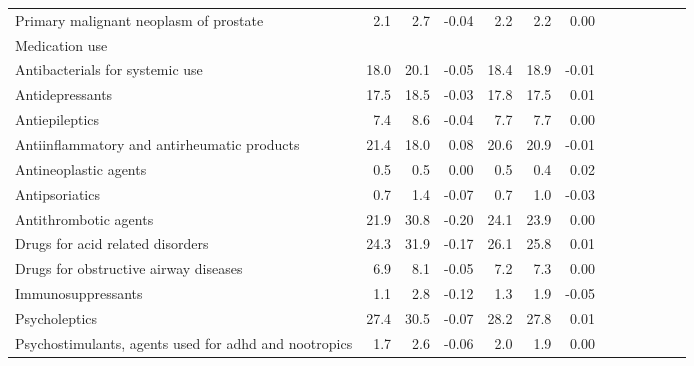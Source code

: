 \documentclass[11pt,]{article}
\begin{document}
\begin{longtable}{lrrrrrrrrrrrr}
      Primary malignant neoplasm of prostate &  2.1 &   2.7 & -0.04 &  2.2 &   2.2 &  0.00 \\ 
  Medication use &    &     &     &    &     &     \\ 
      Antibacterials for systemic use & 18.0 &  20.1 & -0.05 & 18.4 &  18.9 & -0.01 \\ 
      Antidepressants & 17.5 &  18.5 & -0.03 & 17.8 &  17.5 &  0.01 \\ 
      Antiepileptics &  7.4 &   8.6 & -0.04 &  7.7 &   7.7 &  0.00 \\ 
      Antiinflammatory and antirheumatic products & 21.4 &  18.0 &  0.08 & 20.6 &  20.9 & -0.01 \\ 
      Antineoplastic agents &  0.5 &   0.5 &  0.00 &  0.5 &   0.4 &  0.02 \\ 
      Antipsoriatics &  0.7 &   1.4 & -0.07 &  0.7 &   1.0 & -0.03 \\ 
      Antithrombotic agents & 21.9 &  30.8 & -0.20 & 24.1 &  23.9 &  0.00 \\ 
      Drugs for acid related disorders & 24.3 &  31.9 & -0.17 & 26.1 &  25.8 &  0.01 \\ 
      Drugs for obstructive airway diseases &  6.9 &   8.1 & -0.05 &  7.2 &   7.3 &  0.00 \\ 
      Immunosuppressants &  1.1 &   2.8 & -0.12 &  1.3 &   1.9 & -0.05 \\ 
      Psycholeptics & 27.4 &  30.5 & -0.07 & 28.2 &  27.8 &  0.01 \\ 
      Psychostimulants, agents used for adhd and nootropics &  1.7 &   2.6 & -0.06 &  2.0 &   1.9 &  0.00 \\ 
   \bottomrule\end{longtable}
\clearpage
{}
\end{document}
